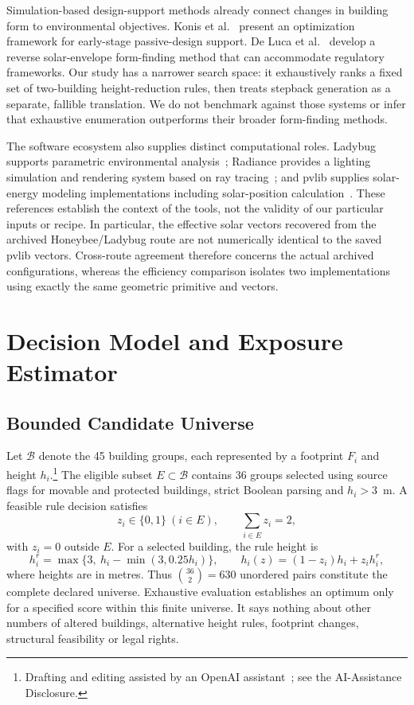 \documentclass{llncs}
\newcommand{\aidraft}{\footnote{Drafting and editing assisted by an OpenAI assistant~\cite{openai2026}; see the AI-Assistance Disclosure.}}
\begin{document}
Simulation-based design-support methods already connect changes in building form to environmental objectives. Konis et al.~\cite{konis2016passive} present an optimization framework for early-stage passive-design support. De Luca et al.~\cite{deluca2021reverse} develop a reverse solar-envelope form-finding method that can accommodate regulatory frameworks. Our study has a narrower search space: it exhaustively ranks a fixed set of two-building height-reduction rules, then treats stepback generation as a separate, fallible translation. We do not benchmark against those systems or infer that exhaustive enumeration outperforms their broader form-finding methods.

The software ecosystem also supplies distinct computational roles. Ladybug supports parametric environmental analysis~\cite{roudsari2013ladybug}; Radiance provides a lighting simulation and rendering system based on ray tracing~\cite{ward1994radiance}; and pvlib supplies solar-energy modeling implementations including solar-position calculation~\cite{holmgren2018pvlib}. These references establish the context of the tools, not the validity of our particular inputs or recipe. In particular, the effective solar vectors recovered from the archived Honeybee/Ladybug route are not numerically identical to the saved pvlib vectors. Cross-route agreement therefore concerns the actual archived configurations, whereas the efficiency comparison isolates two implementations using exactly the same geometric primitive and vectors.

\section{Decision Model and Exposure Estimator}
\subsection{Bounded Candidate Universe}
Let $\mathcal{B}$ denote the 45 building groups, each represented by a footprint $F_i$ and height $h_i$.\aidraft{} The eligible subset $E\subset\mathcal{B}$ contains 36 groups selected using source flags for movable and protected buildings, strict Boolean parsing and $h_i>3$~m. A feasible rule decision satisfies
\begin{equation}
 z_i\in\{0,1\}\ (i\in E),\qquad \sum_{i\in E}z_i=2,
 \label{eq:select}
\end{equation}
with $z_i=0$ outside $E$. For a selected building, the rule height is
\begin{equation}
 h_i^r=\max\{3,\ h_i-\min(3,0.25h_i)\},\qquad
 h_i(z)=(1-z_i)h_i+z_i h_i^r, \label{eq:height}
\end{equation}
where heights are in metres. Thus $\binom{36}{2}=630$ unordered pairs constitute the complete declared universe. Exhaustive evaluation establishes an optimum only for a specified score within this finite universe. It says nothing about other numbers of altered buildings, alternative height rules, footprint changes, structural feasibility or legal rights.
\end{document}
